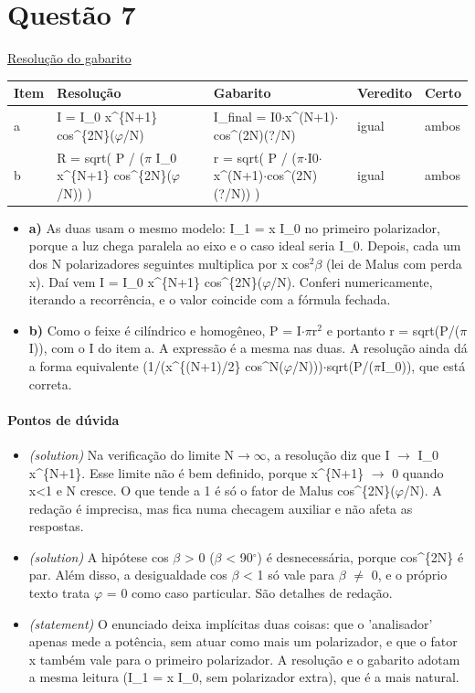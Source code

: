 \documentclass{article}%
\begin{document}
\section*{Questão 7}%
\href{https://poliedroresolve.sistemapoliedro.com.br/vestibulares/ita/2026/ita-2-fase-dia-3-30-10-2025-2-fase-dia-3/dissertativa-7-fisica-2-fase-dia-3-ita-2026}{Resolução do gabarito}\par\smallskip%
\begin{longtable}{@{}p{} p{} p{} p{} p{}@{}}\toprule Item & Resolução & Gabarito & Veredito & Certo \\ \midrule
a & I = I\_0 x\^{}\{N+1\} cos\^{}\{2N\}($\varphi$/N) & I\_final = I0$\cdot$x\^{}(N+1)$\cdot$cos\^{}(2N)(?/N) & igual & ambos \\
b & R = sqrt( P / ($\pi$ I\_0 x\^{}\{N+1\} cos\^{}\{2N\}($\varphi$/N)) ) & r = sqrt( P / ($\pi$$\cdot$I0$\cdot$x\^{}(N+1)$\cdot$cos\^{}(2N)(?/N)) ) & igual & ambos \\
\bottomrule\end{longtable}%
\begin{itemize}%
\item%
\textbf{a)} As duas usam o mesmo modelo: I\_1 = x I\_0 no primeiro polarizador, porque a luz chega paralela ao eixo e o caso ideal seria I\_0. Depois, cada um dos N polarizadores seguintes multiplica por x cos$^2$$\beta$ (lei de Malus com perda x). Daí vem I = I\_0 x\^{}\{N+1\} cos\^{}\{2N\}($\varphi$/N). Conferi numericamente, iterando a recorrência, e o valor coincide com a fórmula fechada.%
\item%
\textbf{b)} Como o feixe é cilíndrico e homogêneo, P = I$\cdot$$\pi$r$^2$ e portanto r = sqrt(P/($\pi$I)), com o I do item a. A expressão é a mesma nas duas. A resolução ainda dá a forma equivalente (1/(x\^{}\{(N+1)/2\} cos\^{}N($\varphi$/N)))$\cdot$sqrt(P/($\pi$I\_0)), que está correta.%
\end{itemize}%
\paragraph{Pontos de dúvida}%
\begin{itemize}%
\item%
\textit{(solution)} Na verificação do limite N$\to$$\infty$, a resolução diz que I $\to$ I\_0 x\^{}\{N+1\}. Esse limite não é bem definido, porque x\^{}\{N+1\} $\to$ 0 quando x<1 e N cresce. O que tende a 1 é só o fator de Malus cos\^{}\{2N\}($\varphi$/N). A redação é imprecisa, mas fica numa checagem auxiliar e não afeta as respostas.%
\item%
\textit{(solution)} A hipótese cos $\beta$ > 0 ($\beta$ < 90$^\circ$) é desnecessária, porque cos\^{}\{2N\} é par. Além disso, a desigualdade cos $\beta$ < 1 só vale para $\beta$ $\neq$ 0, e o próprio texto trata $\varphi$ = 0 como caso particular. São detalhes de redação.%
\item%
\textit{(statement)} O enunciado deixa implícitas duas coisas: que o 'analisador' apenas mede a potência, sem atuar como mais um polarizador, e que o fator x também vale para o primeiro polarizador. A resolução e o gabarito adotam a mesma leitura (I\_1 = x I\_0, sem polarizador extra), que é a mais natural.%
\end{itemize}%
\end{document}
